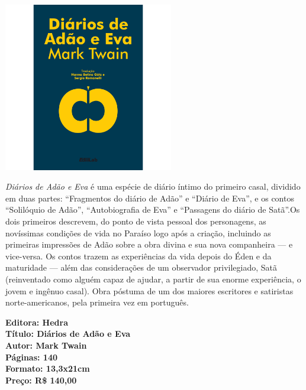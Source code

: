 \pagebreak

\begin{center}
\hspace*{-3.6cm}
\hspace*{3.1cm}\includegraphics[width=74mm]{./grid/diario.png}
\end{center}

\hspace*{-7cm}\hrulefill\hspace*{-7cm}

\medskip

\noindent{}\textit{Diários de Adão e Eva} é uma espécie de diário íntimo do primeiro casal, dividido em duas partes: ``Fragmentos do diário de Adão'' e ``Diário de Eva'', e os contos ``Solilóquio de Adão'', ``Autobiografia de Eva'' e ``Passagens do diário de Satã''.Os dois primeiros descrevem, do ponto de vista pessoal dos personagens, as novíssimas condições de vida no Paraíso logo após a criação, incluindo as primeiras impressões de Adão sobre a obra divina e sua nova companheira --- e vice-versa. Os contos trazem as experiências da vida depois do Éden e da maturidade --- além das considerações de um observador privilegiado, Satã (reinventado como alguém capaz de ajudar, a partir de sua enorme experiência, o jovem e ingênuo casal). Obra póstuma de um dos maiores escritores e satiristas norte-americanos, pela primeira vez em português.

\vfill

\noindent\begin{minipage}[c]{1\linewidth}
{\small\textbf{
\hspace*{-.1cm}Editora: Hedra\\
Título: Diários de Adão e Eva\\
Autor: Mark Twain\\ 
Páginas: 140\\
Formato: 13,3x21cm\\
Preço: R\$ 140,00\\
}}
\end{minipage}

